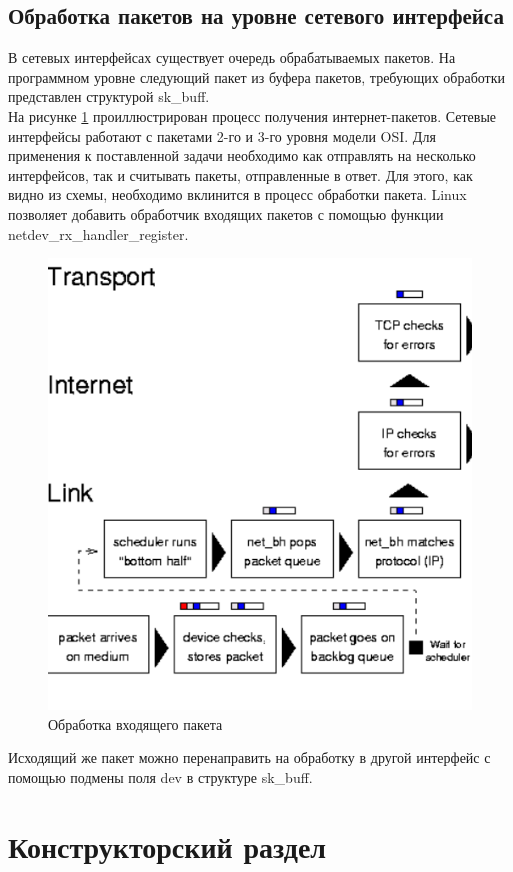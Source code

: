 \documentclass[14pt, a4paper]{extarticle}
\begin{document}
\subsection{Обработка пакетов на уровне сетевого интерфейса}
В сетевых интерфейсах существует очередь обрабатываемых пакетов.  На программном уровне следующий пакет из буфера пакетов, требующих обработки представлен структурой sk\_buff. \\
\indent На рисунке \ref{rx} проиллюстрирован процесс получения интернет-пакетов. Сетевые интерфейсы работают с пакетами 2-го и 3-го уровня модели OSI. Для применения к поставленной задачи необходимо как отправлять на несколько интерфейсов, так и считывать пакеты, отправленные в ответ. Для этого, как видно из схемы, необходимо вклинится в процесс обработки пакета. Linux позволяет добавить обработчик входящих пакетов с помощью функции netdev\_rx\_handler\_register.
\begin{figure}[H]
	\centering
	\includegraphics[scale=0.9]{r_rx.png}
	\caption{Обработка входящего пакета}
	\label{rx}
\end{figure}
\indent \indent Исходящий же пакет можно перенаправить на обработку в другой интерфейс с помощью подмены поля dev в структуре sk\_buff.
\clearpage
\section{Конструкторский раздел}
\end{document}
